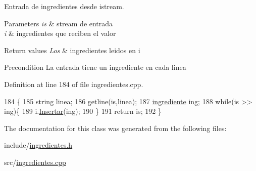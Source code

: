 Entrada de ingredientes desde istream. 


\begin{DoxyParams}{Parameters}
{\em is} & stream de entrada \\
\hline
{\em i} & ingredientes que reciben el valor \\
\hline
\end{DoxyParams}

\begin{DoxyRetVals}{Return values}
{\em Los} & ingredientes leidos en i \\
\hline
\end{DoxyRetVals}
\begin{DoxyPrecond}{Precondition}
La entrada tiene un ingrediente en cada linea 
\end{DoxyPrecond}


Definition at line 184 of file ingredientes.\+cpp.


\begin{DoxyCode}
184                                                    \{
185     \textcolor{keywordtype}{string} linea;
186     getline(is,linea);
187     \hyperlink{classingrediente}{ingrediente} ing;
188     \textcolor{keywordflow}{while}(is >> ing)\{
189         i.\hyperlink{classingredientes_abbf5ea48179d79c13e5abd6c09393ada}{Insertar}(ing);
190     \}
191     \textcolor{keywordflow}{return} is;
192 \}
\end{DoxyCode}


The documentation for this class was generated from the following files\+:\begin{DoxyCompactItemize}
\item 
include/\hyperlink{ingredientes_8h}{ingredientes.\+h}\item 
src/\hyperlink{ingredientes_8cpp}{ingredientes.\+cpp}\end{DoxyCompactItemize}
